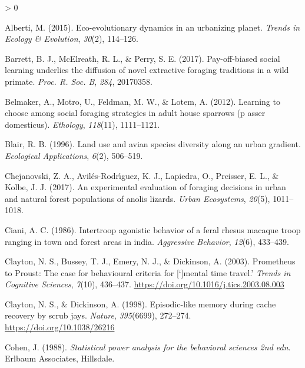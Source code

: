 \documentclass[
]{article}
\newlength{\cslhangindent}
\newenvironment{CSLReferences}[2] %
 {%
  \setlength{\parindent}{0pt}
  \ifodd #1 \everypar{\setlength{\hangindent}{\cslhangindent}}\ignorespaces\fi
  \ifnum #2 > 0
  \setlength{\parskip}{#2\baselineskip}
  \fi
 }%
 {}
\begin{document}
\hypertarget{refs}{}
\begin{CSLReferences}{1}{0}
\leavevmode\hypertarget{ref-alberti2015eco}{}%
Alberti, M. (2015). Eco-evolutionary dynamics in an urbanizing planet.
\emph{Trends in Ecology \& Evolution}, \emph{30}(2), 114--126.

\leavevmode\hypertarget{ref-barrett2017pay}{}%
Barrett, B. J., McElreath, R. L., \& Perry, S. E. (2017). Pay-off-biased
social learning underlies the diffusion of novel extractive foraging
traditions in a wild primate. \emph{Proc. R. Soc. B}, \emph{284},
20170358.

\leavevmode\hypertarget{ref-belmaker2012learning}{}%
Belmaker, A., Motro, U., Feldman, M. W., \& Lotem, A. (2012). Learning
to choose among social foraging strategies in adult house sparrows (p
asser domesticus). \emph{Ethology}, \emph{118}(11), 1111--1121.

\leavevmode\hypertarget{ref-blair1996land}{}%
Blair, R. B. (1996). Land use and avian species diversity along an urban
gradient. \emph{Ecological Applications}, \emph{6}(2), 506--519.

\leavevmode\hypertarget{ref-chejanovski2017experimental}{}%
Chejanovski, Z. A., Avilés-Rodrı́guez, K. J., Lapiedra, O., Preisser, E.
L., \& Kolbe, J. J. (2017). An experimental evaluation of foraging
decisions in urban and natural forest populations of anolis lizards.
\emph{Urban Ecosystems}, \emph{20}(5), 1011--1018.

\leavevmode\hypertarget{ref-ciani1986intertroop}{}%
Ciani, A. C. (1986). Intertroop agonistic behavior of a feral rhesus
macaque troop ranging in town and forest areas in india.
\emph{Aggressive Behavior}, \emph{12}(6), 433--439.

\leavevmode\hypertarget{ref-clayton_prometheus_2003}{}%
Clayton, N. S., Bussey, T. J., Emery, N. J., \& Dickinson, A. (2003).
Prometheus to {Proust}: The case for behavioural criteria for
{[}{`{]}mental time travel.'} \emph{Trends in Cognitive Sciences},
\emph{7}(10), 436--437. \url{https://doi.org/10.1016/j.tics.2003.08.003}

\leavevmode\hypertarget{ref-clayton_episodic-like_1998}{}%
Clayton, N. S., \& Dickinson, A. (1998). Episodic-like memory during
cache recovery by scrub jays. \emph{Nature}, \emph{395}(6699), 272--274.
\url{https://doi.org/10.1038/26216}

\leavevmode\hypertarget{ref-cohen1988statistical}{}%
Cohen, J. (1988). \emph{Statistical power analysis for the behavioral
sciences 2nd edn}. Erlbaum Associates, Hillsdale.


\end{CSLReferences}
\end{document}
